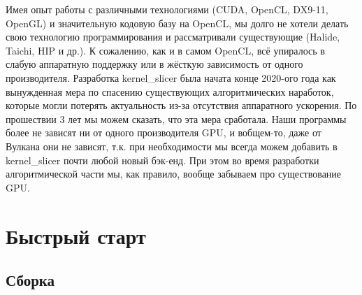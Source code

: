 \documentclass[11pt,fleqn,english,russian]{report} %
\begin{document}
\begin{remark}Имея опыт работы с различными технологиями (CUDA, OpenCL, DX9-11, OpenGL) и значительную кодовую базу на OpenCL, мы долго не хотели делать свою технологию программирования и рассматривали существующие (Halide, Taichi, HIP и др.). К сожалению, как и в самом OpenCL, всё упиралось в слабую аппаратную поддержку или в жёсткую зависимость от одного производителя. Разработка kernel\_slicer была начата конце 2020-ого года как вынужденная мера по спасению существующих алгоритмических наработок, которые могли потерять актуальность из-за отсутствия аппаратного ускорения. По прошествии 3 лет мы можем сказать, что эта мера сработала. Наши программы более не зависят ни от одного производителя GPU, и вобщем-то, даже от Вулкана они не зависят, т.к. при необходимости мы всегда можем добавить в kernel\_slicer почти любой новый бэк-енд. При этом во время разработки алгоритмической части мы, как правило, вообще забываем про существование GPU.
\end{remark}



\chapter{Быстрый старт}

\section{Сборка}
\end{document}
